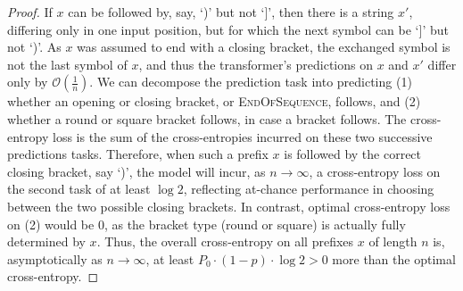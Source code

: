 \documentclass[11pt,a4paper]{article}
\begin{document}
\begin{proof}
If $x$ can be followed by, say, `)' but not `]', then there is a string $x'$, differing only in one input position, but for which the next symbol can be `]' but not `)'.
As $x$ was assumed to end with a closing bracket, the exchanged symbol is not the last symbol of $x$, and thus the transformer's predictions on $x$ and $x'$ differ only by $\mathcal{O}(\frac{1}{n})$.
We can decompose the prediction task into predicting (1) whether an opening or closing bracket, or \textsc{EndOfSequence}, follows, and (2) whether a round or square bracket follows, in case a bracket follows.
The cross-entropy loss is the sum of the cross-entropies incurred on these two successive predictions tasks.
Therefore, when such a prefix $x$ is followed by the correct closing bracket, say `)', the model will incur, as $n \rightarrow \infty$, a cross-entropy loss on the second task of at least $\log 2$, reflecting at-chance performance in choosing between the two possible closing brackets.
In contrast, optimal cross-entropy loss on (2) would be $0$, as the bracket type (round or square) is actually fully determined by $x$.
Thus, the overall cross-entropy on all prefixes $x$ of length $n$ is, asymptotically as $n \rightarrow \infty$, at least $ P_0 \cdot (1-p) \cdot \log 2 > 0$ more than the optimal cross-entropy.
\end{proof}
\end{document}
